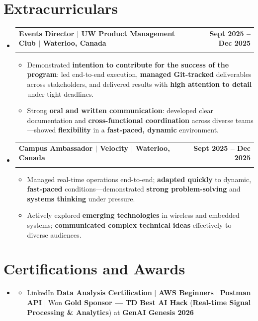 \documentclass[letterpaper,10pt]{article}
\makeatletter
\newcommand{\resumeItem}[1]{
  \item\small{
    {#1 \vspace{-1pt}}
  }
}
\newcommand{\resumeSubheading}[4]{
  \vspace{-1pt}\item
    \begin{tabular*}{1.0\textwidth}[t]{l@{\extracolsep{\fill}}r}
      \textbf{#1} & \textbf{\small #2} \\
      \textit{\small#3} & \textit{\small #4} \\[-2pt]
    \end{tabular*}\vspace{-7pt}
}
\newcommand{\resumeSubHeadingListStart}{\begin{itemize}[leftmargin=0.0in, label={}]}
\newcommand{\resumeSubHeadingListEnd}{\end{itemize}}
\newcommand{\resumeItemListStart}{\begin{itemize}[leftmargin=0.15in]}
\newcommand{\resumeItemListEnd}{\end{itemize}\vspace{-4pt}}
\makeatother
\begin{document}
\section{Extracurriculars}
  \resumeSubHeadingListStart
    \resumeSubheading
      {Events Director $|$ UW Product Management Club $|$ Waterloo, Canada}{Sept 2025 -- Dec 2025}
      {}{}
      \vspace{-13pt}
      \resumeItemListStart
      \vspace{-2pt}
        \resumeItem{Demonstrated \textbf{intention to contribute for the success of the program}: led end-to-end execution, \textbf{managed Git-tracked} deliverables across stakeholders, and delivered results with \textbf{high attention to detail} under tight deadlines.}
        \vspace{-2pt}
        \resumeItem{Strong \textbf{oral and written communication}: developed clear documentation and \textbf{cross-functional coordination} across diverse teams---showed \textbf{flexibility} in a \textbf{fast-paced, dynamic} environment.}
      \resumeItemListEnd
      \vspace{-5pt}
    \resumeSubheading
      {Campus Ambassador $|$ Velocity $|$ Waterloo, Canada}{Sept 2025 -- Dec 2025}
      {}{}
      \vspace{-13pt}
      \resumeItemListStart
      \vspace{-2pt}
        \resumeItem{Managed real-time operations end-to-end; \textbf{adapted quickly} to dynamic, \textbf{fast-paced} conditions---demonstrated \textbf{strong problem-solving} and \textbf{systems thinking} under pressure.}
        \vspace{-2pt}
        \resumeItem{Actively explored \textbf{emerging technologies} in wireless and embedded systems; \textbf{communicated complex technical ideas} effectively to diverse audiences.}
      \resumeItemListEnd
      \vspace{-2pt}
  \resumeSubHeadingListEnd
\vspace{-13pt}

\section{Certifications and Awards}
    \resumeSubHeadingListStart
      \item[]
          \resumeItemListStart
            \resumeItem{LinkedIn \textbf{Data Analysis Certification} $|$ \textbf{AWS Beginners} $|$ \textbf{Postman API} $|$ Won \textbf{Gold Sponsor --- TD Best AI Hack} (\textbf{Real-time Signal Processing \& Analytics}) at \textbf{GenAI Genesis 2026}}
          \resumeItemListEnd
          \vspace{-8pt}
   \resumeSubHeadingListEnd
\end{document}
